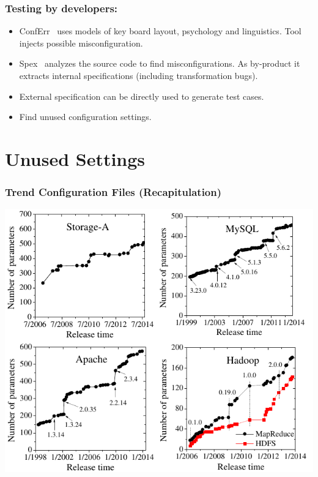 
\begin{frame}
	\frametitle{Testing by developers:}
	\begin{itemize}[<+-| alert@+>]
	\item ConfErr~\cite{keller2008conferr} uses models of key board layout, psychology and linguistics.
	Tool injects possible misconfiguration.
	\item Spex~\cite{xu2013blame} analyzes the source code to find misconfigurations.
	As by-product it extracts internal specifications (including transformation bugs).
	\item External specification can be directly used to generate test cases.
	\item Find unused configuration settings.
	\end{itemize}
\end{frame}

\section{Unused Settings}

\begin{frame}
	\frametitle{Trend Configuration Files (Recapitulation)}
	\includegraphics[scale=0.5]{pics/trend.png}
	\citet{xu2015hey}
\end{frame}

